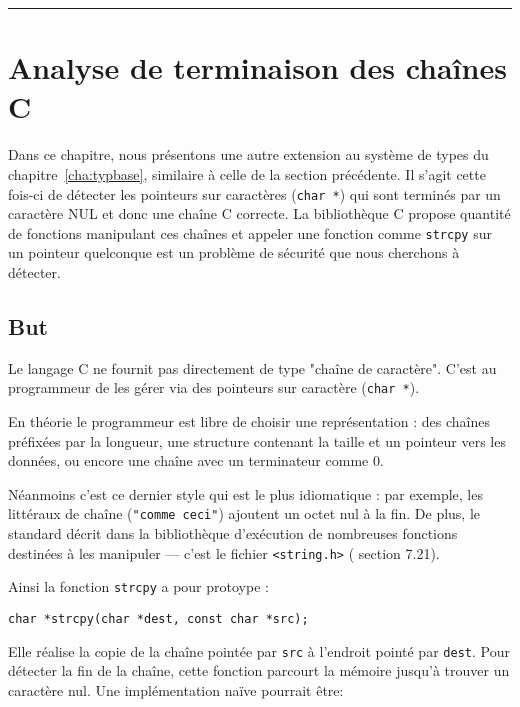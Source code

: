 \begin{center}\rule{3in}{0.4pt}\end{center}

\clearpage

\section{Analyse de terminaison des chaînes C}%

Dans ce chapitre, nous présentons une autre extension au système de types du
chapitre~\ref{cha:typbase}, similaire à celle de la section précédente.
Il s'agit cette fois-ci de détecter les pointeurs sur caractères (\texttt{char
*}) qui sont terminés par un caractère NUL et donc une chaîne C correcte. La
bibliothèque C propose quantité de fonctions manipulant ces chaînes et appeler
une fonction comme \texttt{strcpy} sur un pointeur quelconque est un problème de
sécurité que nous cherchons à détecter.

\subsection{But}

Le langage C ne fournit pas directement de type "chaîne de caractère". C'est au
programmeur de les gérer via des pointeurs sur caractère (\texttt{char *}).

En théorie le programmeur est libre de choisir une représentation : des chaînes
préfixées par la longueur, une structure contenant la taille et un pointeur vers
les données, ou encore une chaîne avec un terminateur comme 0.

Néanmoins c'est ce dernier style qui est le plus idiomatique : par exemple, les
littéraux de chaîne (\texttt{"comme ceci"}) ajoutent un octet nul à la fin. De
plus, le standard décrit dans la bibliothèque d'exécution de nombreuses
fonctions destinées à les manipuler --- c'est le fichier
\texttt{\textless{}string.h\textgreater{}} (\cite{AnsiC} section 7.21).

Ainsi la fonction \texttt{strcpy} a pour protoype :

\begin{Verbatim}
char *strcpy(char *dest, const char *src);
\end{Verbatim}

Elle réalise la copie de la chaîne pointée par \texttt{src} à l'endroit pointé
par \texttt{dest}. Pour détecter la fin de la chaîne, cette fonction parcourt la
mémoire jusqu'à trouver un caractère nul. Une implémentation naïve pourrait être:

